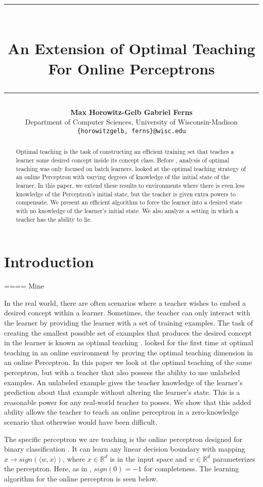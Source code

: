 \documentclass{article}
\title{\rule{350pt}{5pt}\\ \textbf{An Extension of Optimal Teaching For Online Perceptrons} \\ \rule{350pt}{1pt}}
\author{
  \textbf{Max Horowitz-Gelb \qquad Gabriel Ferns}\\
  Department of Computer Sciences, University of Wisconsin-Madison\\
  \texttt{\{horowitzgelb, ferns\}@wisc.edu}\\
}
\begin{document}

\maketitle

\begin{abstract}
  Optimal teaching is the task of constructing an efficient training set
  that teaches a learner some desired concept inside its concept class. Before
  \cite{perceptron}, analysis of optimal teaching was only focused on batch
  learners. \cite{perceptron} looked at the optimal teaching strategy of an
  online Perceptron with varying degrees of knowledge of the initial state of
  the learner. In this paper, we extend these results to environments where
  there is even less knowledge of the Perceptron's initial state, but the
  teacher is given extra powers to compensate. We present an efficient algorithm
  to force the learner into a desired state with no knowledge of the learner's
  initial state. We also analyze a setting in which a teacher has the ability to
  lie.
\end{abstract}

\section{Introduction}
====
Mine

In the real world, there are often scenarios where a teacher wishes to
embed a desired concept within a learner. Sometimes, the teacher can only
interact with the learner by providing the learner with a set of training examples.
The task of creating the smallest possible set of examples that
produces the desired concept in the learner is known as optimal teaching
\cite{machine_teaching} \cite{teaching_dimension}. \cite{perceptron} looked for
the first time at optimal teaching in an online environment by proving the
optimal teaching dimension in an online Perceptron. In this paper we look at the
optimal teaching of the same perceptron, but with a teacher that also possess
the ability to use unlabeled examples. An unlabeled example gives the teacher
knowledge of the learner's prediction about that example without altering the
learner's state. This is a reasonable power for any real-world teacher to
posses. We show that this added ability allows the teacher to teach an
online perceptron in a zero-knowledge scenario that otherwise would have been
difficult.

The specific perceptron we are teaching is the online perceptron
designed for binary classification \cite{perceptron_algo}. It can learn any
linear decision boundary with mapping $x \to sign(\langle w, x \rangle)$, where
$x \in \mathbb{R}^d$ is in the input space and $w \in \mathbb{R}^d$
parameterizes the perceptron. Here, as in \cite{perceptron}, $sign(0) = -1$ for
completeness. The learning algorithm for the online perceptron is seen below.
\end{document}
